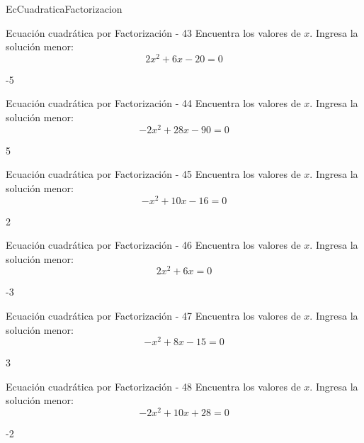 \documentclass[a4,11pt]{aleph-notas}
\begin{document}
\begin{quiz}{EcCuadraticaFactorizacion}
\begin{numerical}[]%
    {Ecuación cuadrática por Factorización - 43}
    Encuentra los valores de $x$. Ingresa la solución menor:
    \[
        2 x^{2} + 6 x - 20 = 0
    \]
    \item[] -5
\end{numerical}

\begin{numerical}[]%
    {Ecuación cuadrática por Factorización - 44}
    Encuentra los valores de $x$. Ingresa la solución menor:
    \[
        - 2 x^{2} + 28 x - 90 = 0
    \]
    \item[] 5
\end{numerical}

\begin{numerical}[]%
    {Ecuación cuadrática por Factorización - 45}
    Encuentra los valores de $x$. Ingresa la solución menor:
    \[
        - x^{2} + 10 x - 16 = 0
    \]
    \item[] 2
\end{numerical}

\begin{numerical}[]%
    {Ecuación cuadrática por Factorización - 46}
    Encuentra los valores de $x$. Ingresa la solución menor:
    \[
        2 x^{2} + 6 x = 0
    \]
    \item[] -3
\end{numerical}

\begin{numerical}[]%
    {Ecuación cuadrática por Factorización - 47}
    Encuentra los valores de $x$. Ingresa la solución menor:
    \[
        - x^{2} + 8 x - 15 = 0
    \]
    \item[] 3
\end{numerical}

\begin{numerical}[]%
    {Ecuación cuadrática por Factorización - 48}
    Encuentra los valores de $x$. Ingresa la solución menor:
    \[
        - 2 x^{2} + 10 x + 28 = 0
    \]
    \item[] -2
\end{numerical}


\end{quiz}
\end{document}
